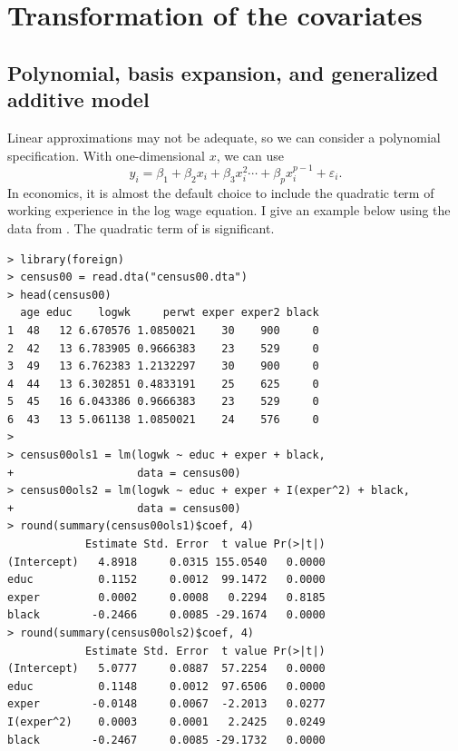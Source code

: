 \section{Transformation of the covariates}

%
%
% 



\subsection{Polynomial, basis expansion, and generalized additive model}\label{eq::basis-expansion}

Linear approximations may not be adequate, so we can consider a polynomial
specification. With one-dimensional $x$, we can use 
\[
y_{i}=\beta_{1}+\beta_{2}x_{i}+\beta_{3}x_{i}^{2}\cdots+\beta_{p}x_{i}^{p-1}+\varepsilon_{i}.
\]
In economics, it is almost the default choice to include the quadratic term of working experience in the log wage equation. I give an example below using the data from \citet{angrist2006quantile}. The quadratic term of  is significant. 


\begin{lstlisting}
> library(foreign)
> census00 = read.dta("census00.dta")
> head(census00)
  age educ    logwk     perwt exper exper2 black
1  48   12 6.670576 1.0850021    30    900     0
2  42   13 6.783905 0.9666383    23    529     0
3  49   13 6.762383 1.2132297    30    900     0
4  44   13 6.302851 0.4833191    25    625     0
5  45   16 6.043386 0.9666383    23    529     0
6  43   13 5.061138 1.0850021    24    576     0
> 
> census00ols1 = lm(logwk ~ educ + exper + black, 
+                   data = census00)
> census00ols2 = lm(logwk ~ educ + exper + I(exper^2) + black, 
+                   data = census00)
> round(summary(census00ols1)$coef, 4)
            Estimate Std. Error  t value Pr(>|t|)
(Intercept)   4.8918     0.0315 155.0540   0.0000
educ          0.1152     0.0012  99.1472   0.0000
exper         0.0002     0.0008   0.2294   0.8185
black        -0.2466     0.0085 -29.1674   0.0000
> round(summary(census00ols2)$coef, 4)
            Estimate Std. Error  t value Pr(>|t|)
(Intercept)   5.0777     0.0887  57.2254   0.0000
educ          0.1148     0.0012  97.6506   0.0000
exper        -0.0148     0.0067  -2.2013   0.0277
I(exper^2)    0.0003     0.0001   2.2425   0.0249
black        -0.2467     0.0085 -29.1732   0.0000
\end{lstlisting}


